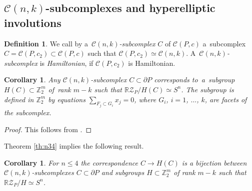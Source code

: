 \documentclass[12pt]{amsart}
\newtheorem{corollary}[formula]{Corollary}
\theoremstyle{definition}
\newtheorem{definition}[formula]{Definition}
\theoremstyle{remark}
\begin{document}
\subsection{$\mathcal{C}(n,k)$-subcomplexes and hyperelliptic involutions}\label{ssec:cnk}
\begin{definition}\label{def:CnkH}
We call by a~{\it $\mathcal{C}(n,k)$-subcomplex} $C$ of $\mathcal{C}(P,c)$ a~subcomplex 
$C=\mathcal{C}(P,c_2)\subset \mathcal{C}(P,c)$ such that $\mathcal{C}(P,c_2)\simeq \mathcal{C}(n,k)$.
A~{\it  $\mathcal{C}(n,k)$-subcomplex} is {\it Hamiltonian}, if $\mathcal{C}(P,c_2)$ is Hamiltonian. 
\end{definition}
\begin{corollary}\label{cor:HCnk}
Any $\mathcal{C}(n,k)$-subcomplex $C\subset\partial P$ corresponds to~a~subgroup $H(C)\subset \mathbb Z_2^m$
of~rank $m-k$ such that $\mathbb{R}\mathcal{Z}_P/H(C)\simeq S^n$. The subgroup is defined in $\mathbb Z_2^m$ by equations 
$\sum\limits_{F_j\subset G_i}x_j=0$, where $G_i$,
$i=1$, $\dots$, $k$, are facets of the subcomplex. 
\end{corollary}
\begin{proof} 
This follows from \cite[Construction 5.8]{E24}.
\end{proof}

Theorem \ref{th:n34} implies the following result.
\begin{corollary}\label{cor:cnk4}
For $n\leqslant 4$ the correspondence $C\to H(C)$  is a bijection between  $\mathcal{C}(n,k)$-subcomplexes $C\subset\partial P$
and subgroups $H\subset \mathbb Z_2^m$ of rank $m-k$ such that $\mathbb{R}\mathcal{Z}_P/H\simeq S^n$.
\end{corollary}
\end{document}
